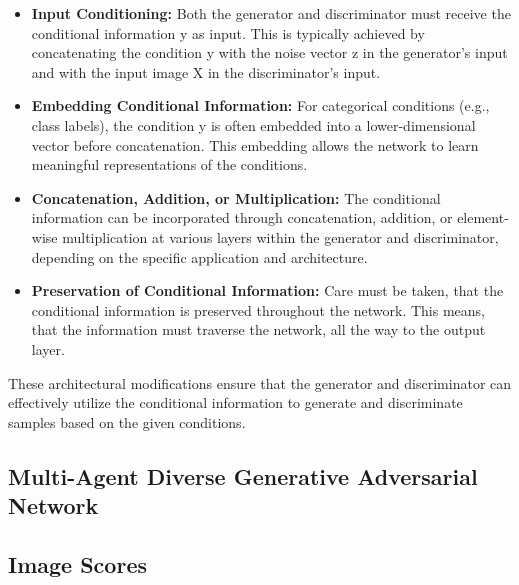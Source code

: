 \begin{itemize}
    \item \textbf{Input Conditioning:} Both the generator and discriminator must receive the conditional information y as input. This is typically achieved by concatenating the condition y with the noise vector z in the generator's input and with the input image X in the discriminator's input.
    \item \textbf{Embedding Conditional Information:} For categorical conditions (e.g., class labels), the condition y is often embedded into a lower-dimensional vector before concatenation. This embedding allows the network to learn meaningful representations of the conditions.
    \item \textbf{Concatenation, Addition, or Multiplication:} The conditional information can be incorporated through concatenation, addition, or element-wise multiplication at various layers within the generator and discriminator, depending on the specific application and architecture.
    \item \textbf{Preservation of Conditional Information:} Care must be taken, that the conditional information is preserved throughout the network. This means, that the information must traverse the network, all the way to the output layer.
\end{itemize}

These architectural modifications ensure that the generator and discriminator can effectively utilize the conditional information to generate and discriminate samples based on the given conditions.

\subsection[Multi-Agent Diverse Generative Adversarial Network - MADGAN]{Multi-Agent Diverse Generative Adversarial Network}
\label{theoretical_madgan}




\subsection{Image Scores}\label{theoretical_image_scores}
